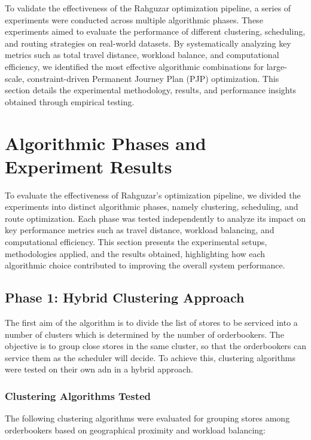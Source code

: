 To validate the effectiveness of the Rahguzar optimization pipeline, a series of experiments were conducted across multiple algorithmic phases. These experiments aimed to evaluate the performance of different clustering, scheduling, and routing strategies on real-world datasets. By systematically analyzing key metrics such as total travel distance, workload balance, and computational efficiency, we identified the most effective algorithmic combinations for large-scale, constraint-driven Permanent Journey Plan (PJP) optimization. This section details the experimental methodology, results, and performance insights obtained through empirical testing.



\section{Algorithmic Phases and Experiment Results}

To evaluate the effectiveness of Rahguzar's optimization pipeline, we divided the experiments into distinct algorithmic phases, namely clustering, scheduling, and route optimization. Each phase was tested independently to analyze its impact on key performance metrics such as travel distance, workload balancing, and computational efficiency. This section presents the experimental setups, methodologies applied, and the results obtained, highlighting how each algorithmic choice contributed to improving the overall system performance.



\subsection{Phase 1: Hybrid Clustering Approach}
The first aim of the algorithm is to divide the list of stores to be serviced into a number of clusters which is determined by the number of orderbookers.
The objective is to group close stores in the same cluster, so that the orderbookers can service them as the scheduler will decide.
To achieve this, clustering algorithms were tested on their own adn in a hybrid approach.

\subsubsection{Clustering Algorithms Tested}

The following clustering algorithms were evaluated for grouping stores among orderbookers based on geographical proximity and workload balancing:

